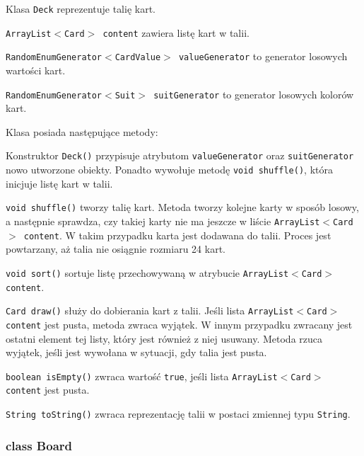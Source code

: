 \documentclass{article}
\begin{document}
Klasa \texttt{Deck} reprezentuje talię kart.

\texttt{ArrayList$<$Card$>$ content} zawiera listę kart w talii. 

\texttt{RandomEnumGenerator$<$CardValue$>$ valueGenerator} to generator losowych wartości kart.

\texttt{RandomEnumGenerator$<$Suit$>$ suitGenerator} to generator losowych kolorów kart.

Klasa posiada następujące metody:

Konstruktor \texttt{Deck()} przypisuje atrybutom \texttt{valueGenerator} oraz \texttt{suitGenerator} nowo utworzone obiekty. Ponadto wywołuje metodę \texttt{void shuffle()}, która inicjuje listę kart w talii.

\texttt{void shuffle()} tworzy talię kart. Metoda tworzy kolejne karty w sposób losowy, a następnie sprawdza, czy takiej karty nie ma jeszcze w liście \texttt{ArrayList$<$Card$>$ content}. W takim przypadku karta jest dodawana do talii. Proces jest powtarzany, aż talia nie osiągnie rozmiaru 24 kart.

\texttt{void sort()} sortuje listę przechowywaną w atrybucie \texttt{ArrayList$<$Card$>$ content}.

\texttt{Card draw()} służy do dobierania kart z talii. Jeśli lista \texttt{ArrayList$<$Card$>$ content} jest pusta, metoda zwraca wyjątek. W innym przypadku zwracany jest ostatni element tej listy, który jest również z niej usuwany. Metoda rzuca wyjątek, jeśli jest wywołana w sytuacji, gdy talia jest pusta.

\texttt{boolean isEmpty()} zwraca wartość \texttt{true}, jeśli lista \texttt{ArrayList$<$Card$>$ content} jest pusta.

\texttt{String toString()} zwraca reprezentację talii w postaci zmiennej typu \texttt{String}.

\subsubsection*{class Board}

\begin{center}
\end{center}
\end{document}
